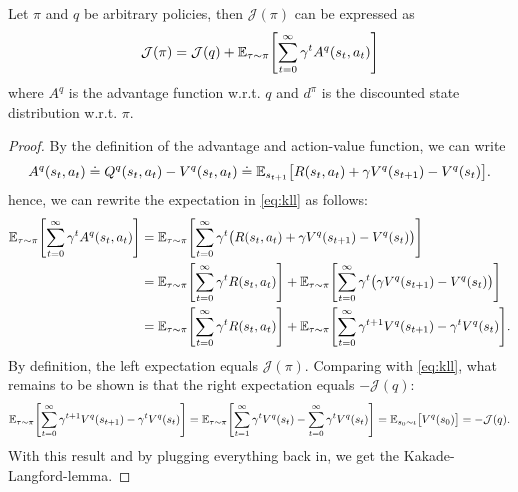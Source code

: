 		\begin{theorem}  \label{th:kll}
			Let \(\pi\) and \(q\) be arbitrary policies, then \(\mathcal{J}(\pi)\) can be expressed as
			\begin{equation}
				\mathcal{J}(\pi) = \mathcal{J}(q) + \mathbb{E}_{\tau \sim \pi}\Biggl[ \sum_{t = 0}^{\infty} \gamma^t A^q(s_t, a_t) \Biggr]  \label{eq:kll}
			\end{equation}
			where \( A^q \) is the advantage function w.r.t. \(q\) and \(d^\pi\) is the discounted state distribution w.r.t. \(\pi\).
		\end{theorem}
		\begin{proof}
			By the definition of the advantage and action-value function, we can write
			\begin{equation}
				A^q(s_t, a_t)
				\doteq Q^q(s_t, a_t) - V^q(s_t, a_t)
				\doteq \mathbb{E}_{s_{t + 1}}\bigl[ R(s_t, a_t) + \gamma V^q(s_{t + 1}) - V^q(s_t) \bigr].
			\end{equation}
			hence, we can rewrite the expectation in \eqref{eq:kll} as follows:
			\begin{align}
				\mathbb{E}_{\tau \sim \pi}\Biggl[ \sum_{t = 0}^{\infty} \gamma^t A^q(s_t, a_t) \Biggr]
				 & = \mathbb{E}_{\tau \sim \pi}\Biggl[ \sum_{t = 0}^{\infty} \gamma^t \bigl( R(s_t, a_t) + \gamma V^q(s_{t + 1}) - V^q(s_t) \bigr) \Biggr]                                                                  \\
				 & = \mathbb{E}_{\tau \sim \pi}\Biggl[ \sum_{t = 0}^{\infty} \gamma^t R(s_t, a_t) \Biggr] + \mathbb{E}_{\tau \sim \pi}\Biggl[ \sum_{t = 0}^{\infty} \gamma^t \bigl( \gamma V^q(s_{t + 1}) - V^q(s_t) \bigr) \Biggr] \\
				 & = \mathbb{E}_{\tau \sim \pi}\Biggl[ \sum_{t = 0}^{\infty} \gamma^t R(s_t, a_t) \Biggr] + \mathbb{E}_{\tau \sim \pi}\Biggl[ \sum_{t = 0}^{\infty} \gamma^{t + 1} V^q(s_{t + 1}) - \gamma^t V^q(s_t) \Biggr].
			\end{align}
			By definition, the left expectation equals \( \mathcal{J}(\pi) \). Comparing with \eqref{eq:kll}, what remains to be shown is that the right expectation equals \( -\mathcal{J}(q) \):
			\begin{equation}
				\mathbb{E}_{\tau \sim \pi}\Biggl[ \sum_{t = 0}^{\infty} \gamma^{t + 1} V^q(s_{t + 1}) - \gamma^t V^q(s_t) \Biggr]
				= \mathbb{E}_{\tau \sim \pi}\Biggl[ \sum_{t = 1}^{\infty} \gamma^t V^q(s_t) - \sum_{t = 0}^{\infty} \gamma^t V^q(s_t) \Biggr]
				= \mathbb{E}_{s_0 \sim \iota}\bigl[ V^q(s_0) \bigr]
				= -\mathcal{J}(q).
			\end{equation}
			With this result and by plugging everything back in, we get the Kakade-Langford-lemma.
		\end{proof}

